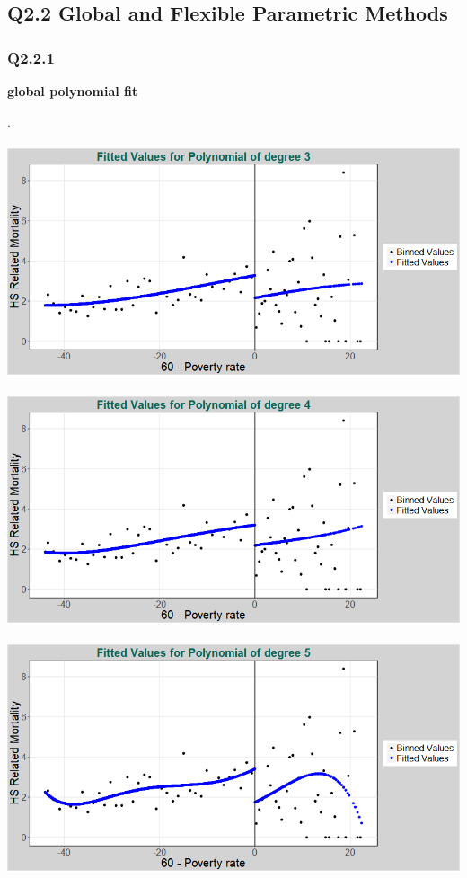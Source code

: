 \documentclass[11pt]{article}
\begin{document}
\subsection{Q2.2 Global and Flexible Parametric Methods}
\subsubsection{Q2.2.1}

\begin{center}
	\centering
	\textbf{global polynomial fit}\par\medskip
	\scalebox{1}{
		
	}
\end{center}
 .
\\ \\


\includegraphics[width=.8\linewidth]{plot_221_poly_3.png}
\\ \\
\includegraphics[width=.8\linewidth]{plot_221_poly_4.png}
\\ \\
\includegraphics[width=.8\linewidth]{plot_221_poly_5.png}
\end{document}
